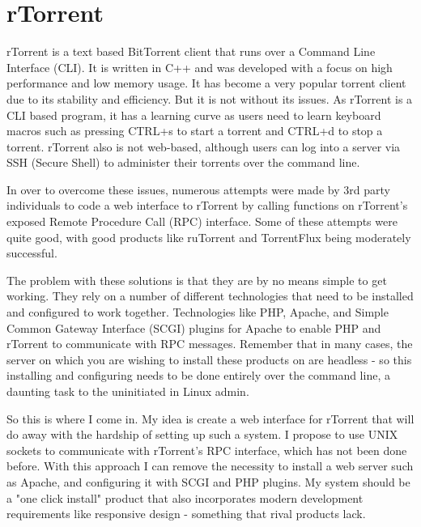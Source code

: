
\section{rTorrent}
rTorrent is a text based BitTorrent client that runs over a Command Line Interface (CLI). It is written in C++ and was developed with a focus on high performance and low memory usage. It has become a very popular torrent client due to its stability and efficiency. But it is not without its issues. As rTorrent is a CLI based program, it has a learning curve as users need to learn keyboard macros such as pressing CTRL+s to start a torrent and CTRL+d to stop a torrent. rTorrent also is not web-based, although users can log into a server via SSH (Secure Shell) to administer their torrents over the command line. 

In over to overcome these issues, numerous attempts were made by 3rd party individuals to code a web interface to rTorrent by calling functions on rTorrent's exposed Remote Procedure Call (RPC) interface. Some of these attempts were quite good, with good products like ruTorrent and TorrentFlux being moderately successful. 

The problem with these solutions is that they are by no means simple to get working. They rely on a number of different technologies that need to be installed and configured to work together. Technologies like PHP, Apache, and Simple Common Gateway Interface (SCGI) plugins for Apache to enable PHP and rTorrent to communicate with RPC messages. Remember that in many cases, the server on which you are wishing to install these products on are headless - so this installing and configuring needs to be done entirely over the command line, a daunting task to the uninitiated in Linux admin. 

So this is where I come in. My idea is create a web interface for rTorrent that will do away with the hardship of setting up such a system. I propose to use UNIX sockets to communicate with rTorrent's RPC interface, which has not been done before. With this approach I can remove the necessity to install a web server such as Apache, and configuring it with SCGI and PHP plugins. My system should be a "one click install" product that also incorporates modern development requirements like responsive design - something that rival products lack.













